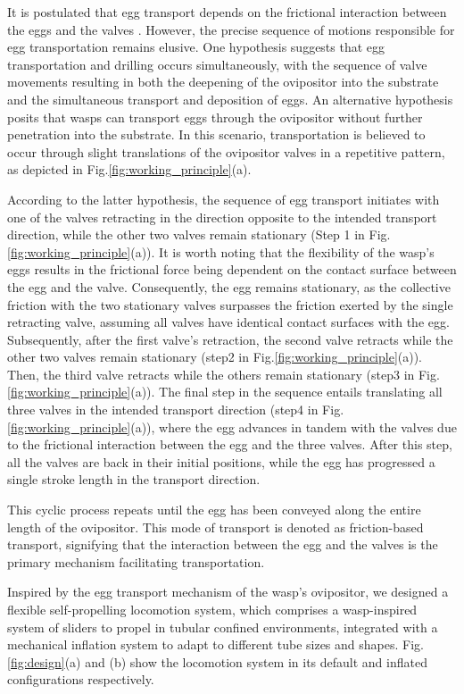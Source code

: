 \documentclass[letterpaper, 10 pt, conference]{ieeeconf}  %
\begin{document}
It is postulated that egg transport depends on the frictional interaction between the eggs and the valves \cite{AUSTIN,AHMED}. However, the precise sequence of motions responsible for egg transportation remains elusive. One hypothesis suggests that egg transportation and drilling occurs simultaneously, with the sequence of valve movements resulting in both the deepening of the ovipositor into the substrate and the simultaneous transport and deposition of eggs. An alternative hypothesis posits that wasps can transport eggs through the ovipositor without further penetration into the substrate. In this scenario, transportation is believed to occur through slight translations of the ovipositor valves in a repetitive pattern, as depicted in Fig.\ref{fig:working_principle}(a).

According to the latter hypothesis, the sequence of egg transport initiates with one of the valves retracting in the direction opposite to the intended transport direction, while the other two valves remain stationary (Step 1 in Fig.\ref{fig:working_principle}(a)). It is worth noting that the flexibility of the wasp's eggs results in the frictional force being dependent on the contact surface between the egg and the valve. Consequently, the egg remains stationary, as the collective friction with the two stationary valves surpasses the friction exerted by the single retracting valve, assuming all valves have identical contact surfaces with the egg. Subsequently, after the first valve's retraction, the second valve retracts while the other two valves remain stationary (step2 in Fig.\ref{fig:working_principle}(a)). Then, the third valve retracts while the others remain stationary (step3 in Fig.\ref{fig:working_principle}(a)). The final step in the sequence entails translating all three valves in the intended transport direction (step4 in Fig.\ref{fig:working_principle}(a)), where the egg advances in tandem with the valves due to the frictional interaction between the egg and the three valves. After this step, all the valves are back in their initial positions, while the egg has progressed a single stroke length in the transport direction. 

This cyclic process repeats until the egg has been conveyed along the entire length of the ovipositor. This mode of transport is denoted as friction-based transport, signifying that the interaction between the egg and the valves is the primary mechanism facilitating transportation.

Inspired by the egg transport mechanism of the wasp's ovipositor, we designed a flexible self-propelling locomotion system, which comprises a wasp-inspired system of sliders to propel in tubular confined environments, integrated with a mechanical inflation system to adapt to different tube sizes and shapes. Fig.\ref{fig:design}(a) and (b) show the locomotion system in its default and inflated configurations respectively.
\end{document}

